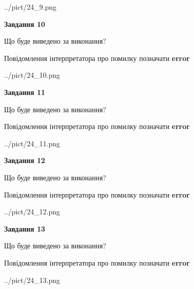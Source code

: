 \documentclass[11pt, ukrainian]{article}
\begin{document}
{\begin {large}
\begin{center}
	{../pict/24_9.png}
\end{center}
\newpage

{\begin {center}\textbf{Завдання 10}\end {center}}\par
Що буде виведено за виконання? \par
Повідомлення інтерпретатора про помилку позначати \textbf{error}

\begin{center}
	{../pict/24_10.png}
\end{center}
\newpage

{\begin {center}\textbf{Завдання 11}\end {center}}\par
Що буде виведено за виконання? \par
Повідомлення інтерпретатора про помилку позначати \textbf{error}

\begin{center}
	{../pict/24_11.png}
\end{center}
\newpage

{\begin {center}\textbf{Завдання 12}\end {center}}\par
Що буде виведено за виконання? \par
Повідомлення інтерпретатора про помилку позначати \textbf{error}

\begin{center}
	{../pict/24_12.png}
\end{center}
\newpage

{\begin {center}\textbf{Завдання 13}\end {center}}\par
Що буде виведено за виконання? \par
Повідомлення інтерпретатора про помилку позначати \textbf{error}

\begin{center}
	{../pict/24_13.png}
\end{center}
\newpage


\end{large}}
\end{document}

